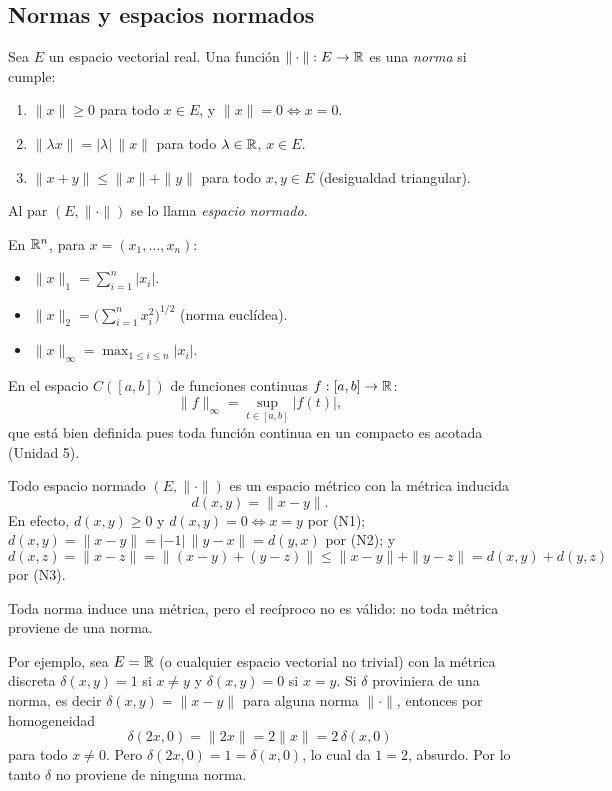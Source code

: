 \subsection{Normas y espacios normados}

\begin{defi}[Norma]
Sea $E$ un espacio vectorial real. Una función $\|\cdot\| : E \to \mathbb{R}$ es
una \emph{norma} si cumple:
\begin{enumerate}[label=(N\arabic*)]
    \item $\|x\| \ge 0$ para todo $x\in E$, y $\|x\|=0 \iff x=0$.
    \item $\|\lambda x\| = |\lambda|\,\|x\|$ para todo $\lambda\in\mathbb{R}$,
    $x\in E$.
    \item $\|x+y\| \le \|x\|+\|y\|$ para todo $x,y\in E$ (desigualdad
    triangular).
\end{enumerate}
Al par $(E,\|\cdot\|)$ se lo llama \emph{espacio normado}.
\end{defi}

\begin{ej}
En $\mathbb{R}^n$, para $x=(x_1,\dots,x_n)$:
\begin{itemize}
    \item $\|x\|_1 = \displaystyle\sum_{i=1}^n |x_i|$.
    \item $\|x\|_2 = \displaystyle\Big(\sum_{i=1}^n x_i^2\Big)^{1/2}$
    (norma euclídea).
    \item $\|x\|_\infty = \displaystyle\max_{1\le i\le n} |x_i|$.
\end{itemize}
En el espacio $C([a,b])$ de funciones continuas $f:[a,b]\to\mathbb{R}$:
\[
\|f\|_\infty = \sup_{t\in[a,b]} |f(t)|,
\]
que está bien definida pues toda función continua en un compacto es
acotada (Unidad 5).
\end{ej}

\begin{obs}
Todo espacio normado $(E,\|\cdot\|)$ es un espacio métrico con la
métrica inducida
\[
d(x,y) = \|x-y\|.
\]
En efecto, $d(x,y)\ge0$ y $d(x,y)=0 \iff x=y$ por (N1); $d(x,y)=\|x-y\|=
|-1|\,\|y-x\|=d(y,x)$ por (N2); y
\[
d(x,z)=\|x-z\|=\|(x-y)+(y-z)\|\le\|x-y\|+\|y-z\|=d(x,y)+d(y,z)
\]
por (N3).
\end{obs}

\begin{obs}
Toda norma induce una métrica, pero el recíproco no es válido: no toda
métrica proviene de una norma.

Por ejemplo, sea $E=\mathbb{R}$ (o cualquier espacio vectorial no trivial) con
la métrica discreta $\delta(x,y)=1$ si $x\ne y$ y $\delta(x,y)=0$ si
$x=y$. Si $\delta$ proviniera de una norma, es decir
$\delta(x,y)=\|x-y\|$ para alguna norma $\|\cdot\|$, entonces por
homogeneidad
\[
\delta(2x,0) = \|2x\| = 2\|x\| = 2\,\delta(x,0)
\]
para todo $x\ne0$. Pero $\delta(2x,0)=1=\delta(x,0)$, lo cual da $1=2$,
absurdo. Por lo tanto $\delta$ no proviene de ninguna norma.
\end{obs}

